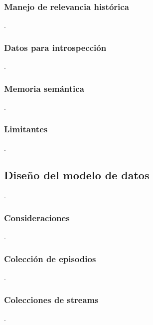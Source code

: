 \subsubsection{Manejo de relevancia histórica}
 .

\subsubsection{Datos para introspección}
 .

\subsubsection{Memoria semántica}
 .

\subsubsection{Limitantes}
 .


\subsection{Diseño del modelo de datos}
 .

\subsubsection{Consideraciones}
 .

\subsubsection{Colección de episodios}
 .

\subsubsection{Colecciones de streams}
 .

